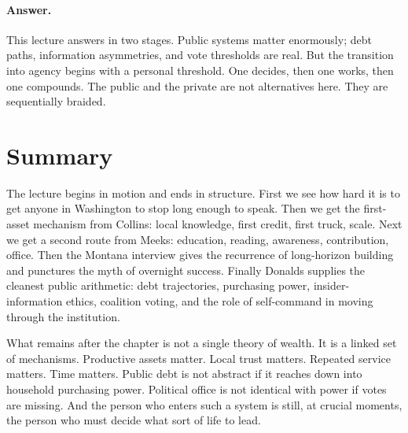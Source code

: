 \paragraph{Answer.} This lecture answers in two stages. Public systems matter enormously; debt paths, information asymmetries, and vote thresholds are real. But the transition into agency begins with a personal threshold. One decides, then one works, then one compounds. The public and the private are not alternatives here. They are sequentially braided.

\section{Summary}

The lecture begins in motion and ends in structure. First we see how hard it is to get anyone in Washington to stop long enough to speak. Then we get the first-asset mechanism from Collins: local knowledge, first credit, first truck, scale. Next we get a second route from Meeks: education, reading, awareness, contribution, office. Then the Montana interview gives the recurrence of long-horizon building and punctures the myth of overnight success. Finally Donalds supplies the cleanest public arithmetic: debt trajectories, purchasing power, insider-information ethics, coalition voting, and the role of self-command in moving through the institution.

What remains after the chapter is not a single theory of wealth. It is a linked set of mechanisms. Productive assets matter. Local trust matters. Repeated service matters. Time matters. Public debt is not abstract if it reaches down into household purchasing power. Political office is not identical with power if votes are missing. And the person who enters such a system is still, at crucial moments, the person who must decide what sort of life to lead.